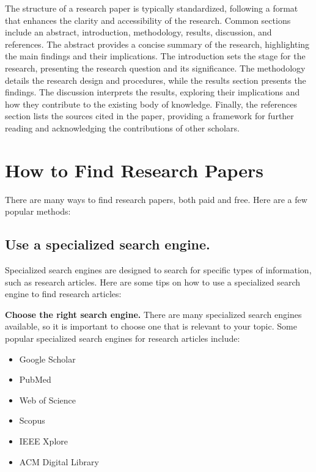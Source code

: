 \documentclass[
]{book}
\begin{document}
The structure of a research paper is typically standardized, following a format that enhances the clarity and accessibility of the research. Common sections include an abstract, introduction, methodology, results, discussion, and references. The abstract provides a concise summary of the research, highlighting the main findings and their implications. The introduction sets the stage for the research, presenting the research question and its significance. The methodology details the research design and procedures, while the results section presents the findings. The discussion interprets the results, exploring their implications and how they contribute to the existing body of knowledge. Finally, the references section lists the sources cited in the paper, providing a framework for further reading and acknowledging the contributions of other scholars.

\section{How to Find Research Papers}\label{find}

There are many ways to find research papers, both paid and free. Here are a few popular methods:

\subsection*{Use a specialized search engine.}\label{use-a-specialized-search-engine.}

Specialized search engines are designed to search for specific types of information, such as research articles. Here are some tips on how to use a specialized search engine to find research articles:

\textbf{Choose the right search engine.} There are many specialized search engines available, so it is important to choose one that is relevant to your topic. Some popular specialized search engines for research articles include:

\begin{itemize}
\item
  Google Scholar
\item
  PubMed
\item
  Web of Science
\item
  Scopus
\item
  IEEE Xplore
\item
  ACM Digital Library
\end{itemize}
\end{document}
